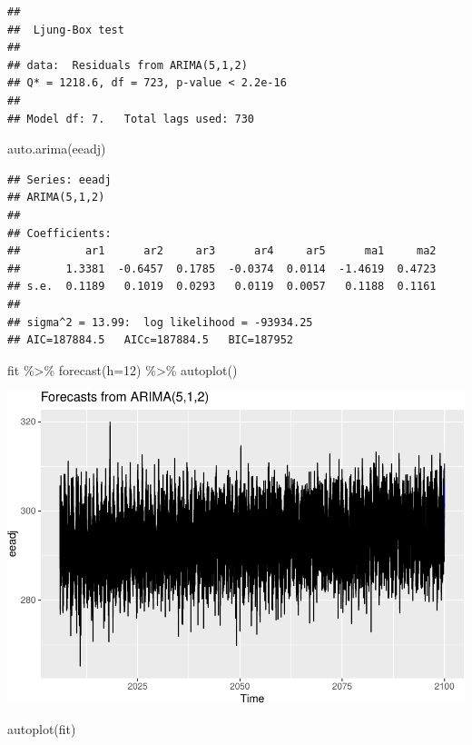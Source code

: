 \documentclass[
  paper=a4,
  ,captions=tableheading
]{scrartcl}
\newenvironment{Shaded}{\begin{snugshade}}{\end{snugshade}}
\newcommand{\AttributeTok}[1]{\textcolor[rgb]{0.77,0.63,0.00}{#1}}
\newcommand{\DecValTok}[1]{\textcolor[rgb]{0.00,0.00,0.81}{#1}}
\newcommand{\FunctionTok}[1]{\textcolor[rgb]{0.00,0.00,0.00}{#1}}
\newcommand{\NormalTok}[1]{#1}
\newcommand{\SpecialCharTok}[1]{\textcolor[rgb]{0.00,0.00,0.00}{#1}}
\begin{document}
\begin{verbatim}
## 
##  Ljung-Box test
## 
## data:  Residuals from ARIMA(5,1,2)
## Q* = 1218.6, df = 723, p-value < 2.2e-16
## 
## Model df: 7.   Total lags used: 730
\end{verbatim}

\begin{Shaded}
\begin{Highlighting}[]
\FunctionTok{auto.arima}\NormalTok{(eeadj)}
\end{Highlighting}
\end{Shaded}

\begin{verbatim}
## Series: eeadj 
## ARIMA(5,1,2) 
## 
## Coefficients:
##          ar1      ar2     ar3      ar4     ar5      ma1     ma2
##       1.3381  -0.6457  0.1785  -0.0374  0.0114  -1.4619  0.4723
## s.e.  0.1189   0.1019  0.0293   0.0119  0.0057   0.1188  0.1161
## 
## sigma^2 = 13.99:  log likelihood = -93934.25
## AIC=187884.5   AICc=187884.5   BIC=187952
\end{verbatim}

\begin{Shaded}
\begin{Highlighting}[]
\NormalTok{fit }\SpecialCharTok{\%\textgreater{}\%} \FunctionTok{forecast}\NormalTok{(}\AttributeTok{h=}\DecValTok{12}\NormalTok{) }\SpecialCharTok{\%\textgreater{}\%} \FunctionTok{autoplot}\NormalTok{()}
\end{Highlighting}
\end{Shaded}

\includegraphics{Haskell_files/figure-latex/unnamed-chunk-70-1.pdf}

\begin{Shaded}
\begin{Highlighting}[]
\FunctionTok{autoplot}\NormalTok{(fit)}
\end{Highlighting}
\end{Shaded}
\end{document}
